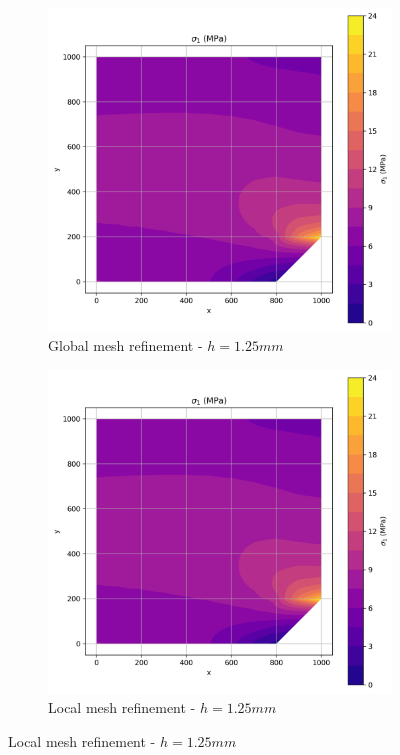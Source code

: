 \begin{figure}[H]
  \centering
  \begin{subfigure}[b]{0.45\textwidth}
    \centering
    \includegraphics[width=\textwidth]{GRAFICOS/Quad4/1.25mm_global/resultados - sigma_1.png}
    \caption{Global mesh refinement - $h=1.25mm$}
    \label{fig:img13}
  \end{subfigure}
  \hfill
  \begin{subfigure}[b]{0.45\textwidth}
    \centering
    \includegraphics[width=\textwidth]{GRAFICOS/Quad4/1.25mm_global/resultados - sigma_1.png}
    \caption{Local mesh refinement - $h=1.25mm$}
    \label{fig:img23}
  \end{subfigure}
\end{figure}

